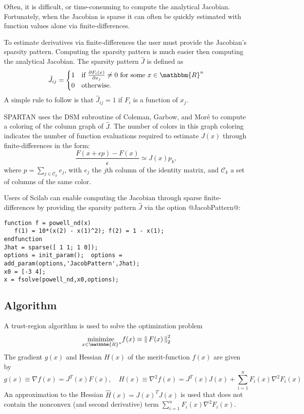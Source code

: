 \documentclass[10pt]{article}
\newcommand{\solverf}{\sffamily}
\newcommand{\norm}[1]{\left\lVert\,#1\,\right\rVert}
\newcommand{\R}{\mathbbm{R}}
\newcommand{\grad}{\nabla}
\newcommand{\minimize}{\text{minimize }}
\newcommand{\scilab}{{\sc Scilab}}
\newcommand{\spartan}{{\solverf SPARTAN}}
\newcommand{\dsm}{{\solverf DSM}}
\begin{document}
Often, it is difficult, or time-consuming to compute the analytical
Jacobian.  Fortunately, when the Jacobian is sparse it can often be
quickly estimated with function values alone via finite-differences.

To estimate derivatives via finite-differences the user must provide
the Jacobian's sparsity pattern.  Computing the sparsity pattern is
much easier then computing the analytical Jacobian. The sparsity
pattern $\hat{J}$ is defined as 
\begin{equation}
\hat{J}_{ij} = \begin{cases}  1 & \text{if } \frac{\partial F_i(x)}{\partial x_j} \ne 0 \text{ for some } x \in \R^n \\
                              0 &  \text{otherwise}.
               \end{cases}
\end{equation}
A simple rule to follow is that $\hat{J}_{ij} = 1$ if $F_i$ is a function of $x_j$.

\spartan{} uses the \dsm{} subroutine of Coleman, Garbow, and Mor\'{e}
\cite{algorithm618,columncoloring} to compute a coloring of the column graph of
$\hat{J}$. The number of colors in this graph coloring indicates the
number of function evaluations required to estimate $J(x)$ through
finite-differences in the form:
\begin{equation}
\frac{F(x+\epsilon p) - F(x)}{\epsilon} \simeq J(x) p_k, 
\end{equation}
where $p = \sum_{j \in \mathcal{C}_k} e_j$, with $e_j$  
the $j$th column of the identity matrix, and $\mathcal{C}_k$ 
a set of columns of the same color.

Users of \scilab{} can enable computing the Jacobian through sparse
finite-differences by providing the sparsity pattern $\hat{J}$ via 
the option @JacobPattern@: 
\begin{Verbatim}[fontsize=\small]
function f = powell_nd(x) 
   f(1) = 10*(x(2) - x(1)^2); f(2) = 1 - x(1);
endfunction 
Jhat = sparse([ 1 1; 1 0]);
options = init_param();  options = add_param(options,'JacobPattern',Jhat);
x0 = [-3 4]; 
x = fsolve(powell_nd,x0,options);
\end{Verbatim}



\subsection*{Algorithm}
A trust-region algorithm is used to solve the optimization 
problem 
\begin{equation}
\underset{x \in \R^n}{\minimize} f(x) \equiv \norm{F(x)}^2_2
\end{equation}
The gradient $g(x)$ and Hessian $H(x)$ of the merit-function $f(x)$ are 
given by 
\begin{equation}
g(x) \equiv \grad f(x) = J^T(x) F(x), \quad H(x) \equiv \grad^2 f(x) = 
J^T(x) J(x)  + \sum_{i=1}^n F_i(x) \grad^2 F_i(x)
\end{equation}
An approximation to the Hessian $\hat{H}(x) = J(x)^T J(x)$ is used
that does not contain the nonconvex (and second derivative) term
$\sum_{i=1}^n F_i(x) \grad^2 F_i(x)$.
\end{document}
